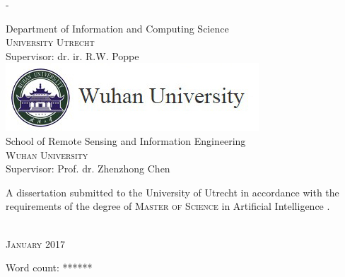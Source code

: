 \begin{titlingpage}
\begin{SingleSpace}
\begin{adjustwidth*}{\unitlength}{-\unitlength}
\begin{center}
{\large Department of Information and Computing Science  \\
	\textsc{University Utrecht}}\\
{\large Supervisor: dr. ir. R.W. Poppe}\\
\vspace{6mm}
\includegraphics[scale=0.6]{logos/whu_2.png}\\
\vspace{3mm}
{\large School of Remote Sensing and Information Engineering  \\
	\textsc{Wuhan University}}\\
{\large Supervisor: Prof. dr. Zhenzhong Chen}\\
\vspace{11mm}
\begin{minipage}{10cm}
A dissertation submitted to the University of Utrecht in accordance with the requirements of the degree of \textsc{Master of Science} in Artificial Intelligence .
\end{minipage}\\
\vspace{9mm}
{\large\textsc{January 2017}}
\vspace{12mm}
\end{center}
\begin{flushright}
{\small Word count: ******}
\end{flushright}
\end{adjustwidth*}
\end{SingleSpace}
\end{titlingpage}
